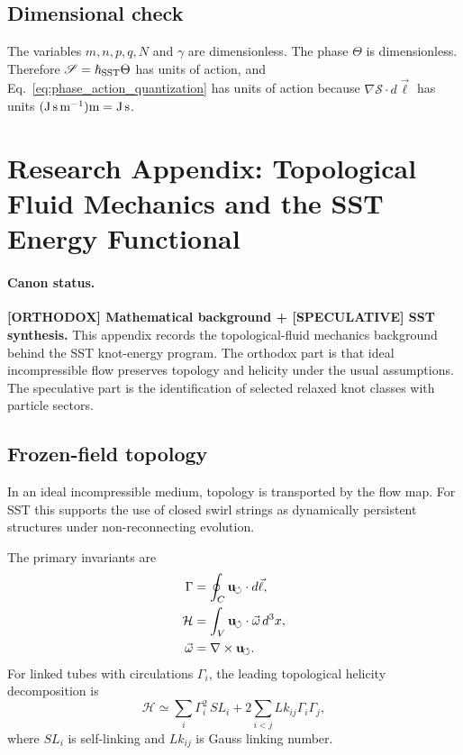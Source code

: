 \subsection{Dimensional check}
The variables $m,n,p,q,N$ and $\gamma$ are dimensionless. The phase $\Theta$ is dimensionless. Therefore $\mathscr S=\hbar_{\rm SST}\Theta$ has units of action, and Eq.~\eqref{eq:phase_action_quantization} has units of action because $\nabla\mathscr S\cdot d\vec\ell$ has units $({\rm J\,s\,m^{-1}}){\rm m}={\rm J\,s}$.

\section{Research Appendix: Topological Fluid Mechanics and the SST Energy Functional}
\label{app:tfm_energy_functional}

\paragraph{Canon status.}
\textbf{[ORTHODOX] Mathematical background + [SPECULATIVE] SST synthesis.}
This appendix records the topological-fluid mechanics background behind the SST knot-energy program. The orthodox part is that ideal incompressible flow preserves topology and helicity under the usual assumptions. The speculative part is the identification of selected relaxed knot classes with particle sectors.

\subsection{Frozen-field topology}
In an ideal incompressible medium, topology is transported by the flow map. For SST this supports the use of closed swirl strings as dynamically persistent structures under non-reconnecting evolution.

The primary invariants are
\begin{align}
    \Gamma &= \oint_C \mathbf{u}_{\!\boldsymbol{\circlearrowleft}}\cdot d\vec\ell,\label{eq:gamma_appendix}\\
    \mathcal H &= \int_V \mathbf{u}_{\!\boldsymbol{\circlearrowleft}}\cdot\vec\omega\,d^3x,\label{eq:helicity_appendix}\\
    \vec\omega &= \nabla\times\mathbf{u}_{\!\boldsymbol{\circlearrowleft}}.\label{eq:vorticity_appendix}
\end{align}
For linked tubes with circulations $\Gamma_i$, the leading topological helicity decomposition is
\begin{equation}
    \mathcal H
    \simeq
    \sum_i \Gamma_i^2\,SL_i
    +2\sum_{i<j}Lk_{ij}\Gamma_i\Gamma_j,
    \label{eq:helicity_link_decomposition}
\end{equation}
where $SL_i$ is self-linking and $Lk_{ij}$ is Gauss linking number.

